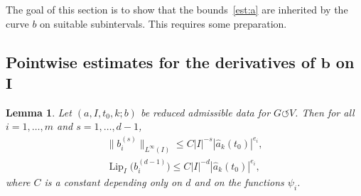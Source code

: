 \documentclass[pdftex]{sigma}
\numberwithin{equation}{section}
\newtheorem{Lemma}[Theorem]{Lemma}
\def\ps{\psi}
\def\Lip{\on{Lip}}
\def\we{\hat}
\def\acts{\circlearrowleft}
\let\on=\operatorname
\begin{document}
The goal of this section is to show that the bounds~\eqref{est:a} are inherited by the curve $b$ on suitable subintervals.
This requires some preparation.

\subsection[Pointwise estimates for the derivatives of b on I]
{Pointwise estimates for the derivatives of $\boldsymbol b$ on~$\boldsymbol I$}
\begin{Lemma} %
 Let $(a, I, t_0, k; b)$ be reduced admissible data for $G \acts V$.
 Then for all
 $i=1,\dots,m$ and $s = 1,\dots,d-1$,
 \begin{gather}
 \big\| b_i^{(s)} \big\|_{L^\infty(I)} \le C |I|^{-s} |\we a_k (t_0)|^{e_i},\nonumber
 \\
 \Lip_I\big( b_i^{(d-1)}\big) \le C |I|^{-d} |\we a_k (t_0)|^{e_i},
\label{eq:b_ider}
 \end{gather}
 where $C$ is a constant depending only on $d$ and on the functions $\ps_i$.
\end{Lemma}
\end{document}
